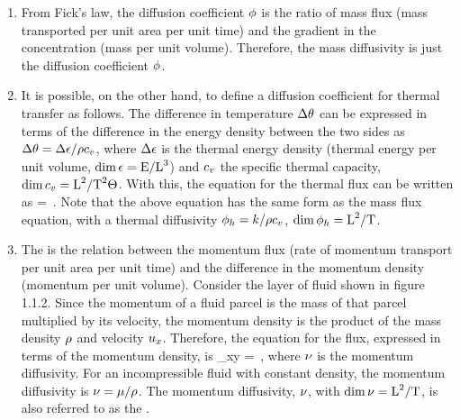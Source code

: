 \begin{enumerate}
\item From Fick's law, the diffusion coefficient $\phi$ is the ratio of mass flux (mass transported per unit area per unit time) and the gradient in the concentration (mass per unit volume). Therefore, the mass diffusivity is just the diffusion coefficient $\phi$.

\item It is possible, on the other hand, to define a diffusion coefficient for thermal transfer as follows. The difference in temperature $\Delta\theta$ can be expressed in terms of the difference in the energy density between the two sides as $\Delta\theta = \Delta\epsilon/\rho c_v$, where $\Delta\epsilon$ is the thermal energy density (thermal energy per unit volume, $\dim\epsilon = \text{E}/\text{L}^3$) and $c_v$ the specific thermal capacity, $\dim c_v = \text{L}^2/\text{T}^2\Theta$. With this, the equation for the thermal flux can be written as
\beq
\flux\then = \dfrac{\kthcond}{\dens\kshcap_\vol}\dfrac{\Dx\thendens}{\length}\,.
\eeq
Note that the above equation has the same form as the mass flux equation, with a thermal diffusivity $\phi_h = k/\rho c_v$, $\dim\phi_h = \text{L}^2/\text{T}$.

\item The  is the relation between the momentum flux (rate of momentum transport per unit area per unit time) and the difference in the momentum density (momentum per unit volume). Consider the layer of fluid shown in figure 1.1.2. Since the momentum of a fluid parcel is the mass of that parcel multiplied by its velocity, the momentum density is the product of the mass density $\rho$ and velocity $u_x$. Therefore, the equation for the flux, expressed in terms of the momentum density, is
\beq
\shear_{xy} = \kinvis{}\,,
\eeq
where $\nu$ is the momentum diffusivity. For an incompressible fluid with constant density, the momentum diffusivity is $\nu = \mu/\rho$. The momentum diffusivity, $\nu$, with $\dim\nu = \text{L}^2/\text{T}$, is also referred to as the .
\end{enumerate}


